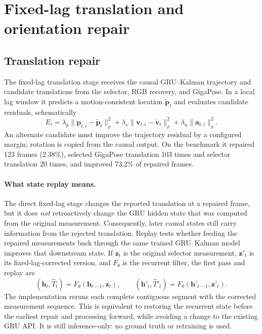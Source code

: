 \documentclass[11pt]{article}
\begin{document}
\section{Fixed-lag translation and orientation repair}

\subsection{Translation repair}

The fixed-lag translation stage receives the causal GRU--Kalman trajectory and candidate translations from the selector, RGB recovery, and GigaPose.  In a local lag window it predicts a motion-consistent location $\tilde{\bm p}_t$ and evaluates candidate residuals, schematically
\begin{equation}
E_i=\lambda_p\|\bm p_{t,i}-\tilde{\bm p}_t\|_{\rho}^2+
\lambda_v\|\bm v_{t,i}-\tilde{\bm v}_t\|_{\rho}^2+
\lambda_a\|\bm a_{t,i}\|_{\rho}^2.
\end{equation}
An alternate candidate must improve the trajectory residual by a configured margin; rotation is copied from the causal output.  On the benchmark it repaired 123 frames (2.38\%), selected GigaPose translation 103 times and selector translation 20 times, and improved 73.2\% of repaired frames.

\paragraph{What state replay means.}
The direct fixed-lag stage changes the reported translation at a repaired frame, but it does \emph{not} retroactively change the GRU hidden state that was computed from the original measurement.  Consequently, later causal states still carry information from the rejected translation.  Replay tests whether feeding the repaired measurements back through the same trained GRU--Kalman model improves that downstream state.  If $\bm z_t$ is the original selector measurement, $\bm z'_t$ is its fixed-lag-corrected version, and $F_\theta$ is the recurrent filter, the first pass and replay are
\begin{equation}
(\bm h_t,\hat T_t)=F_\theta(\bm h_{t-1},\bm z_t),\qquad
(\bm h'_t,\hat T'_t)=F_\theta(\bm h'_{t-1},\bm z'_t).
\end{equation}
The implementation reruns each complete contiguous segment with the corrected measurement sequence.  This is equivalent to restoring the recurrent state before the earliest repair and processing forward, while avoiding a change to the existing GRU API.  It is still inference-only: no ground truth or retraining is used.
\end{document}
